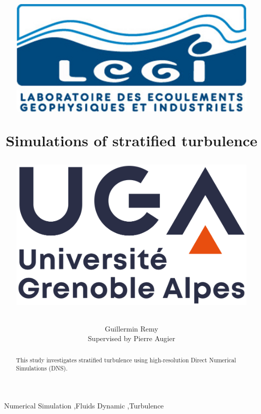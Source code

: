 \documentclass[final,5p,times,twocolumn,authoryear]{elsarticle}
\begin{document}
\begin{frontmatter}

\title{
\begin{minipage}{0.3\textwidth}
\includegraphics[width=0.9\textwidth]{LEGI-logo.png}
\end{minipage}%
\begin{minipage}{0.4\textwidth}
\centering
\textbf{Simulations of stratified turbulence}
\end{minipage}%
\begin{minipage}{0.3\textwidth}
\flushright
\includegraphics[width=0.9\textwidth]{UGA-logo.png}
\end{minipage}
}

\author{Guillermin Remy\\ Supervised by Pierre Augier}

\begin{abstract}
This study investigates stratified turbulence using high-resolution Direct Numerical Simulations (DNS).
\end{abstract}

\begin{keyword}
Numerical Simulation \sep Fluids Dynamic \sep Turbulence

\end{keyword}

\end{frontmatter}
\end{document}
